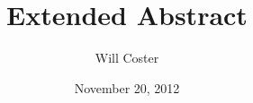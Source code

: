 \documentclass[finalcopy,short]{srpaper}
\title{Extended Abstract}
\author{Will Coster}
\date{November 20, 2012}
\begin{document}
  \frontmatter
  \nocite{*}



\end{document}

